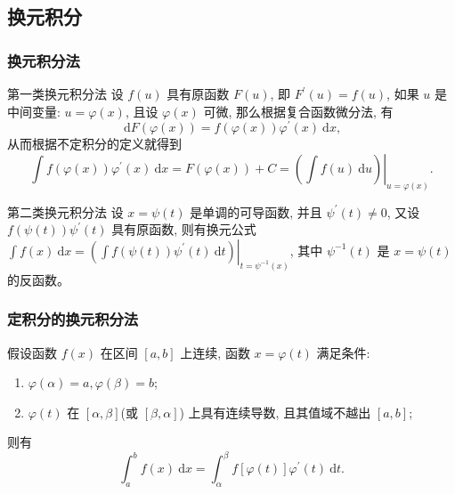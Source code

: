 \documentclass[
10pt,
aspectratio=43,
]{beamer}
\begin{document}
\subsection{换元积分}
\begin{frame}
	\frametitle{换元积分法}
	\everymath{\displaystyle}
	\begin{block}{第一类换元积分法}
		设 $f(u)$ 具有原函数 $F(u)$, 即 $F^{\prime}(u)=f(u)$, 如果 $u$ 是中间变量: $u=\varphi(x)$, 且设 $\varphi(x)$ 可微, 那么根据复合函数微分法, 有
		$$
			\mathrm{~d} F(\varphi(x))=f(\varphi(x)) \varphi^{\prime}(x) \mathrm{~d} x,
		$$ 从而根据不定积分的定义就得到
		$$
			\int f(\varphi(x)) \varphi^{\prime}(x) \mathrm{~d} x=F(\varphi(x))+C=\left.\left(\int f(u) \mathrm{~d} u\right)\right|_{u=\varphi(x)}.
		$$
	\end{block}
	\pause
	\begin{block}{第二类换元积分法}
		设 $x=\psi(t)$ 是单调的可导函数, 并且 $\psi^{\prime}(t) \neq 0$, 又设 $f(\psi(t)) \psi^{\prime}(t)$ 具有原函数, 则有换元公式 $\int f(x) \mathrm{~d} x=\left.\left(\int f(\psi(t)) \psi^{\prime}(t) \mathrm{~d} t\right)\right|_{t=\psi^{-1}(x)}$, 其中 $\psi^{-1}(t)$ 是 $x=\psi(t)$ 的反函数。
	\end{block}
\end{frame}

\begin{frame}
	\frametitle{定积分的换元积分法}
	\everymath{\displaystyle}
	\begin{theorem}[定积分的换元积分法]
		假设函数 $f(x)$ 在区间 $[a,b]$ 上连续, 函数 $x=\varphi(t)$ 满足条件:
		\begin{enumerate}
			\item $\varphi(\alpha)=a, \varphi(\beta)=b$;
			\item $\varphi(t)$ 在 $[\alpha, \beta]$(或 $[\beta, \alpha]$) 上具有连续导数, 且其值域不越出 $[a, b]$;
		\end{enumerate}
		则有
		$$
			\int_a^b f(x) \mathrm{~d} x=\int_\alpha^\beta f\left[\varphi(t)\right] \varphi^{\prime}(t) \mathrm{~d} t .
		$$
	\end{theorem}
\end{frame}
\end{document}
